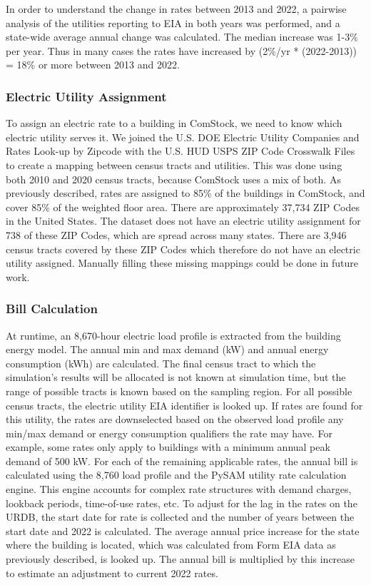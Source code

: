In order to understand the change in rates between 2013 and 2022, a pairwise analysis of the utilities reporting to EIA \citep{eia_electricity} in both years was performed, and a state-wide average annual change was calculated. The median increase was 1-3\% per year. Thus in many cases the rates have increased by (2\%/yr * (2022-2013)) = 18\% or more between 2013 and 2022.

\subsubsection{Electric Utility Assignment}
To assign an electric rate to a building in ComStock, we need to know which electric utility serves it. We joined the U.S. DOE Electric Utility Companies and Rates Look-up by Zipcode \citep{zip_to_util} with the U.S. HUD USPS ZIP Code Crosswalk Files \citep{tract_to_zip} to create a mapping between census tracts and utilities. This was done using both 2010 and 2020 census tracts, because ComStock uses a mix of both.
As previously described, rates are assigned to 85\% of the buildings in ComStock, and cover 85\% of the weighted floor area. There are approximately 37,734 ZIP Codes in the United States. The dataset does not have an electric utility assignment for 738 of these ZIP Codes, which are spread across many states. There are 3,946 census tracts covered by these ZIP Codes which therefore do not have an electric utility assigned. Manually filling these missing mappings could be done in future work.

\subsubsection{Bill Calculation}
At runtime, an 8,670-hour electric load profile is extracted from the building energy model. The annual min and max demand (kW) and annual energy consumption (kWh) are calculated. The final census tract to which the simulation's results will be allocated is not known at simulation time, but the range of possible tracts is known based on the sampling region. For all possible census tracts, the electric utility EIA identifier is looked up. If rates are found for this utility, the rates are downselected based on the observed load profile any min/max demand or energy consumption qualifiers the rate may have. For example, some rates only apply to buildings with a minimum annual peak demand of 500 kW.
For each of the remaining applicable rates, the annual bill is calculated using the 8,760 load profile and the PySAM utility rate calculation engine. This engine accounts for complex rate structures with demand charges, lookback periods, time-of-use rates, etc. To adjust for the lag in the rates on the URDB, the start date for rate is collected and the number of years between the start date and 2022 is calculated. The average annual price increase for the state where the building is located, which was calculated from Form EIA data as previously described, is looked up. The annual bill is multiplied by this increase to estimate an adjustment to current 2022 rates.

